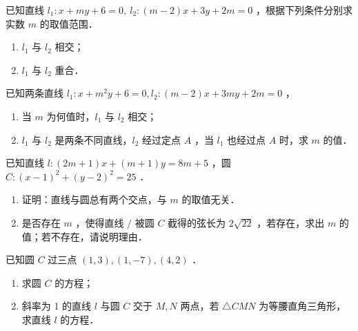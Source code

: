 \begin{example}
    已知直线 $l_1: x+m y+6=0, ~ l_2:(m-2) x+3 y+2 m=0$ ，根据下列条件分别求实数 $m$ 的取值范围．
    \begin{enumerate}
        \item $l_1$ 与 $l_2$ 相交；

        \item $l_1$ 与 $l_2$ 重合．
    \end{enumerate}
\end{example}

\begin{example}
    已知两条直线 $l_1: x+m^2 y+6=0, l_2:(m-2) x+3 m y+2 m=0$ ，
    \begin{enumerate}
        \item 当 $m$ 为何值时，$l_1$ 与 $l_2$ 相交；

        \item $l_1$ 与 $l_2$ 是两条不同直线，$l_2$ 经过定点 $A$ ，当 $l_1$ 也经过点 $A$ 时，求 $m$ 的值．
    \end{enumerate}
\end{example}

\begin{example}
    已知直线 $l:(2 m+1) x+(m+1) y=8 m+5$ ，圆 $C:(x-1)^2+(y-2)^2=25$ ．
    \begin{enumerate}
        \item 证明：直线与圆总有两个交点，与 $m$ 的取值无关．

        \item 是否存在 $m$ ，使得直线 $/$ 被圆 $C$ 截得的弦长为 $2 \sqrt{22}$ ，若存在，求出 $m$ 的值；若不存在，请说明理由．
    \end{enumerate}
\end{example}

\begin{example}
    已知圆 $C$ 过三点 $(1,3),(1,-7),(4,2)$ ．
    \begin{enumerate}
        \item 求圆 $C$ 的方程；

        \item 斜率为 1 的直线 $l$ 与圆 $C$ 交于 $M, N$ 两点，若 $\triangle C M N$ 为等腰直角三角形，求直线 $l$ 的方程．
    \end{enumerate}
\end{example}